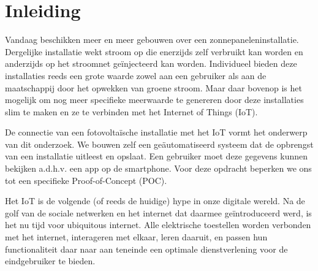 \documentclass{hogent-article}
\affiliation{
    \textsuperscript{1} \href{mailto:bart.depaepe@student.hogent.be}{bart.depaepe@student.hogent.be}}
\begin{document}
    
    \flushbottom %
    \maketitle %
    \tableofcontents %
    \thispagestyle{empty} %
    
    
    \section{Inleiding}
    
    Vandaag beschikken meer en meer gebouwen over een zonnepaneleninstallatie. Dergelijke installatie wekt stroom op die enerzijds zelf verbruikt kan worden en anderzijds op het stroomnet geïnjecteerd kan worden. Individueel bieden deze installaties reeds een grote waarde zowel aan een gebruiker als aan de maatschappij door het opwekken van groene stroom. Maar daar bovenop is het mogelijk om nog meer specifieke meerwaarde te genereren door deze installaties slim te maken en ze te verbinden met het Internet of Things (IoT).
    
    De connectie van een fotovoltaïsche installatie met het IoT vormt het onderwerp van dit onderzoek. We bouwen zelf een geäutomatiseerd systeem dat de opbrengst van een installatie uitleest en opslaat. Een gebruiker moet deze gegevens kunnen bekijken a.d.h.v. een app op de smartphone. Voor deze opdracht beperken we ons tot een specifieke Proof-of-Concept (POC).
    
    Het IoT is de volgende (of reeds de huidige) hype in onze digitale wereld. Na de golf van de sociale netwerken en het internet dat daarmee geïntroduceerd werd, is het nu tijd voor ubiquitous internet. Alle elektrische toestellen worden verbonden met het internet, interageren met elkaar, leren daaruit, en passen hun functionaliteit daar naar aan teneinde een optimale dienstverlening voor de eindgebruiker te bieden.
    
\end{document}
